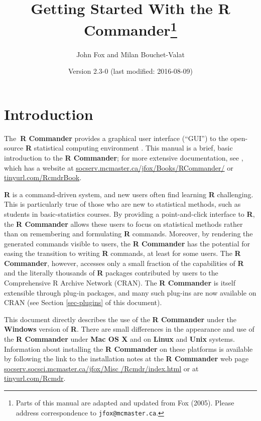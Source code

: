 \documentclass{article}%
\begin{document}
\title{Getting Started With the R Commander\thanks{Parts of this manual are adapted
and updated from Fox (2005). Please address correspondence to
\texttt{jfox@mcmaster.ca}. }}
\author{John Fox and Milan Bouchet-Valat}
\date{Version 2.3-0 (last modified: 2016-08-09)}
\maketitle

\section{Introduction}

The\textbf{\ R Commander} \citep{Fox05, Fox17} provides a graphical user
interface (\textquotedblleft GUI\textquotedblright) to the open-source
\textbf{R } statistical computing environment \citep{RCore16}. This manual is a brief,
basic introduction to the \textbf{R Commander}; for more extensive documentation,
see \citet{Fox17}, which has a website at \href{http://socserv.mcmaster.ca/jfox/Books/RCommander/}{socserv.mcmaster.ca/jfox/Books/RCommander/} 
or \href{http://tinyurl.com/RcmdrBook}{tinyurl.com/RcmdrBook}.

\textbf{R} is a command-driven system, and new users
often find learning \textbf{R} challenging. This is particularly true of those
who are new to statistical methods, such as students in basic-statistics
courses. By providing a point-and-click interface to \textbf{R}, the \textbf{R
Commander} allows these users to focus on statistical methods rather than on
remembering and formulating \textbf{R} commands. Moreover, by rendering the
generated commands visible to users, the \textbf{R Commander} has the
potential for easing the transition to writing \textbf{R} commands, at least
for some users. The \textbf{R Commander}, however, accesses only a small
fraction of the capabilities of \textbf{R} and the literally thousands of
\textbf{R} packages contributed by users to the Comprehensive R Archive
Network (CRAN). The \textbf{R Commander} is itself extensible through plug-in
packages, and many such plug-ins are now available on CRAN (see Section
\ref{sec-plugins} of this document).

This document directly describes the use of the \textbf{R Commander} under the
\textbf{Windows} version of \textbf{R}. There are small differences in the
appearance and use of the \textbf{R Commander} under \textbf{Mac OS X} and on
\textbf{Linux} and \textbf{Unix} systems. Information about installing the
\textbf{R Commander} on these platforms is available by following the link to
the installation notes at the \textbf{R Commander} web page
\href{http://socserv.socsci.mcmaster.ca/jfox/Misc/Rcmdr/index.html}{socserv.socsci.mcmaster.ca/jfox/Misc /Rcmdr/index.html} or at
\href{http://tinyurl.com/Rcmdr}{tinyurl.com/Rcmdr}.
\end{document}
